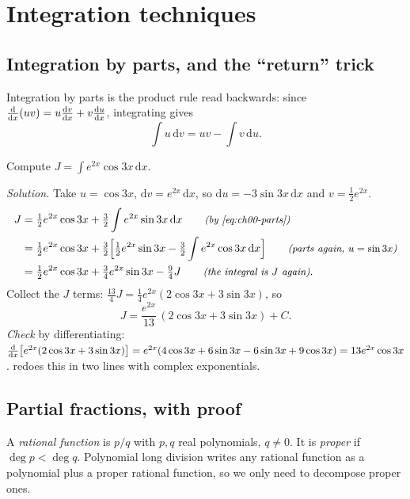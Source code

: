 \section{Integration techniques}\label{sec:ch00-integration}

\subsection{Integration by parts, and the ``return'' trick}

Integration by parts is the product rule read backwards: since
$\frac{\mathrm{d}}{\mathrm{d}x}(uv) = u\frac{\mathrm{d}v}{\mathrm{d}x} + v\frac{\mathrm{d}u}{\mathrm{d}x}$, integrating gives
\begin{equation}\label{eq:ch00-parts}
  \int u\,\mathrm{d}v = uv - \int v\,\mathrm{d}u .
\end{equation}

\begin{example}\label{ex:ch00-e2xcos3x}
Compute $J = \int e^{2x}\cos 3x\,\mathrm{d}x$.

\emph{Solution.} Take $u = \cos 3x$, $\mathrm{d}v = e^{2x}\,\mathrm{d}x$, so
$\mathrm{d}u = -3\sin 3x\,\mathrm{d}x$ and $v = \tfrac12 e^{2x}$.
\begin{align*}
  J &= \tfrac12 e^{2x}\cos 3x + \tfrac32\int e^{2x}\sin 3x\,\mathrm{d}x
     \qquad\text{\small\itshape(by \eqref{eq:ch00-parts})}\\
    &= \tfrac12 e^{2x}\cos 3x
       + \tfrac32\Bigl[\tfrac12 e^{2x}\sin 3x - \tfrac32 \int e^{2x}\cos 3x\,\mathrm{d}x\Bigr]
     \qquad\text{\small\itshape(parts again, $u=\sin 3x$)}\\
    &= \tfrac12 e^{2x}\cos 3x + \tfrac34 e^{2x}\sin 3x - \tfrac94 J
     \qquad\text{\small\itshape(the integral is $J$ again)}.
\end{align*}
Collect the $J$ terms: $\tfrac{13}{4}J = \tfrac14 e^{2x}(2\cos 3x + 3\sin 3x)$,
so
\[
  J = \frac{e^{2x}}{13}\,(2\cos 3x + 3\sin 3x) + C .
\]
\emph{Check} by differentiating:
$\frac{\mathrm{d}}{\mathrm{d}x}\bigl[e^{2x}(2\cos 3x + 3\sin 3x)\bigr]
 = e^{2x}(4\cos 3x + 6\sin 3x - 6\sin 3x + 9\cos 3x) = 13e^{2x}\cos 3x$.
 redoes this in two lines with complex
exponentials.
\end{example}

\subsection{Partial fractions, with proof}

A \emph{rational function} is $p/q$ with $p,q$ real polynomials, $q\neq 0$. It
is \emph{proper} if $\deg p < \deg q$. Polynomial long division writes any
rational function as a polynomial plus a proper rational function, so we only
need to decompose proper ones.

